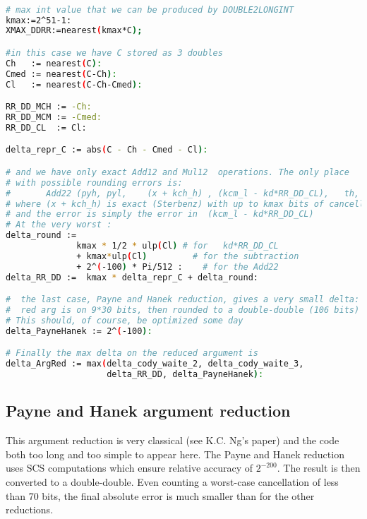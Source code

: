 \begin{lstlisting}[caption={Computing constants for Cody and Waite
    double-double}, firstnumber=1,
  language={sh}]% of course it's maple
%Skip a line here, I don't know why, otherwise latex eats the first line

# max int value that we can be produced by DOUBLE2LONGINT
kmax:=2^51-1:
XMAX_DDRR:=nearest(kmax*C);

#in this case we have C stored as 3 doubles
Ch   := nearest(C):
Cmed := nearest(C-Ch):
Cl   := nearest(C-Ch-Cmed):

RR_DD_MCH := -Ch:
RR_DD_MCM := -Cmed:
RR_DD_CL  := Cl:

delta_repr_C := abs(C - Ch - Cmed - Cl):

# and we have only exact Add12 and Mul12  operations. The only place
# with possible rounding errors is:
#       Add22 (pyh, pyl,    (x + kch_h) , (kcm_l - kd*RR_DD_CL),   th, tl) ;
# where (x + kch_h) is exact (Sterbenz) with up to kmax bits of cancellation
# and the error is simply the error in  (kcm_l - kd*RR_DD_CL)
# At the very worst :
delta_round :=
              kmax * 1/2 * ulp(Cl) # for   kd*RR_DD_CL
              + kmax*ulp(Cl)         # for the subtraction
              + 2^(-100) * Pi/512 :    # for the Add22
delta_RR_DD :=  kmax * delta_repr_C + delta_round:

#  the last case, Payne and Hanek reduction, gives a very small delta:
#  red arg is on 9*30 bits, then rounded to a double-double (106 bits)
# This should, of course, be optimized some day
delta_PayneHanek := 2^(-100):

# Finally the max delta on the reduced argument is
delta_ArgRed := max(delta_cody_waite_2, delta_cody_waite_3,
                    delta_RR_DD, delta_PayneHanek):
\end{lstlisting}


\subsection{Payne and Hanek argument reduction }

This argument reduction is very classical (see K.C. Ng's paper) and
the code both too long and too simple to appear here. The Payne and
Hanek reduction uses SCS computations which ensure relative accuracy
of $2^{-200}$. The result is then converted to a double-double.
Even counting a worst-case cancellation of less than 70 bits, the final
absolute error is much smaller than for the other reductions. 

